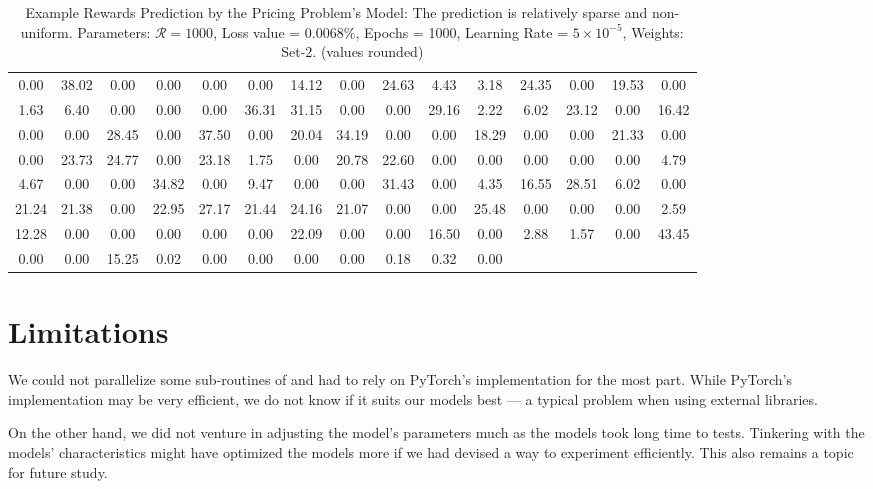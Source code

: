 \begin{table}[!htbp]
    \centering
    \caption[Example Rewards Prediction by the Pricing Problem's Model]{Example Rewards Prediction by the Pricing Problem's Model: The prediction is relatively sparse and non-uniform. Parameters: $\mathcal{R} = 1000$, Loss value = $0.0068\%$, Epochs = 1000, Learning Rate = $5 \times 10^{-5}$, Weights: Set-2. (values rounded)}
    \label{tab:Example Rewards Prediction by the Pricing Problem's Model}
    \setlength\tabcolsep{2pt}
    \begin{tabular}{|*{15}{c}|}
        \hline
        0.00 & 38.02 & 0.00 & 0.00 & 0.00 & 0.00 & 14.12 & 0.00 & 24.63 & 4.43 & 3.18 & 24.35 & 0.00 & 19.53 & 0.00\\
        1.63 & 6.40 & 0.00 & 0.00 & 0.00 & 36.31 & 31.15 & 0.00 & 0.00 & 29.16 & 2.22 & 6.02 & 23.12 & 0.00 & 16.42\\
        0.00 & 0.00 & 28.45 & 0.00 & 37.50 & 0.00 & 20.04 & 34.19 & 0.00 & 0.00 & 18.29 & 0.00 & 0.00 & 21.33 & 0.00\\
        0.00 & 23.73 & 24.77 & 0.00 & 23.18 & 1.75 & 0.00 & 20.78 & 22.60 & 0.00 & 0.00 & 0.00 & 0.00 & 0.00 & 4.79\\
        4.67 & 0.00 & 0.00 & 34.82 & 0.00 & 9.47 & 0.00 & 0.00 & 31.43 & 0.00 & 4.35 & 16.55 & 28.51 & 6.02 & 0.00\\
        21.24 & 21.38 & 0.00 & 22.95 & 27.17 & 21.44 & 24.16 & 21.07 & 0.00 & 0.00 & 25.48 & 0.00 & 0.00 & 0.00 & 2.59\\
        12.28 & 0.00 & 0.00 & 0.00 & 0.00 & 0.00 & 22.09 & 0.00 & 0.00 & 16.50 & 0.00 & 2.88 & 1.57 & 0.00 & 43.45\\
        0.00 & 0.00 & 15.25 & 0.02 & 0.00 & 0.00 & 0.00 & 0.00 & 0.18 & 0.32 & 0.00&&&&\\ \hline
    \end{tabular}
\end{table}

\section{Limitations} \label{sec:Limitations}
We could not parallelize some sub-routines of  and had to rely on PyTorch's implementation for the most part. While PyTorch's implementation \cite{PTDocs} may be very efficient, we do not know if it suits our models best --- a typical problem when using external libraries.

On the other hand, we did not venture in adjusting the model's parameters much as the models took long time to tests. Tinkering with the models' characteristics might have optimized the models more if we had devised a way to experiment efficiently. This also remains a topic for future study.


